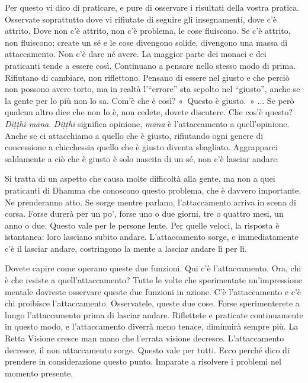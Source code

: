 Per questo vi dico di praticare, e pure di osservare i risultati della
vostra pratica. Osservate soprattutto dove vi rifiutate di seguire gli
insegnamenti, dove c'è attrito. Dove non c'è attrito, non c'è problema,
le cose fluiscono. Se c'è attrito, non fluiscono; create un sé e le cose
divengono solide, divengono una massa di attaccamento. Non c'è dare né
avere. La maggior parte dei monaci e dei praticanti tende a essere così.
Continuano a pensare nello stesso modo di prima. Rifiutano di cambiare,
non riflettono. Pensano di essere nel giusto e che perciò non possono
avere torto, ma in realtà l'``errore'' sta sepolto nel ``giusto'', anche
se la gente per lo più non lo sa. Com'è che è così? «~Questo è giusto.~»
... Se però qualcun altro dice che non lo è, non cedete, dovete
discutere. Che cos'è questo? \emph{Diṭṭhi-māna}. \emph{Diṭṭhi} significa
opinione, \emph{māna} è l'attaccamento a quell'opinione. Anche se ci
attacchiamo a quello che è giusto, rifiutando ogni genere di concessione
a chicchessia quello che è giusto diventa sbagliato. Aggrapparci
saldamente a ciò che è giusto è solo nascita di un sé, non c'è lasciar
andare.

Si tratta di un aspetto che causa molte difficoltà alla gente, ma non a
quei praticanti di Dhamma che conoscono questo problema, che è davvero
importante. Ne prenderanno atto. Se sorge mentre parlano,
l'attaccamento arriva in scena di corsa. Forse durerà per un po', forse
uno o due giorni, tre o quattro mesi, un anno o due. Questo vale per le
persone lente. Per quelle veloci, la risposta è istantanea: loro
lasciano subito andare. L'attaccamento sorge, e immediatamente c'è il
lasciar andare, costringono la mente a lasciar andare lì per lì.

Dovete capire come operano queste due funzioni. Qui c'è l'attaccamento.
Ora, chi è che resiste a quell'attaccamento? Tutte le volte che
sperimentate un'impressione mentale dovreste osservare queste due
funzioni in azione. C'è l'attaccamento e c'è chi proibisce
l'attaccamento. Osservatele, queste due cose. Forse sperimenterete a
lungo l'attaccamento prima di lasciar andare. Riflettete e praticate
continuamente in questo modo, e l'attaccamento diverrà meno tenace,
diminuirà sempre più. La Retta Visione cresce man mano che l'errata
visione decresce. L'attaccamento decresce, il non attaccamento sorge.
Questo vale per tutti. Ecco perché dico di prendere in considerazione
questo punto. Imparate a risolvere i problemi nel momento presente.

